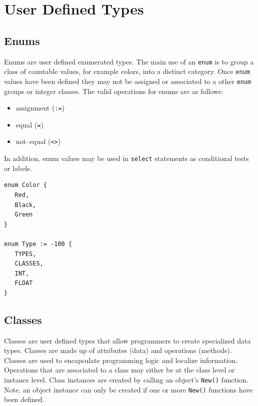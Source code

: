 \documentclass[11pt]{article}
\begin{document}
\section{User Defined Types}

\subsection{Enums}
Enums are user defined enumerated types.  The main use of an
\texttt{enum} is to group a class of countable values, for example
colors, into a distinct category.  Once \texttt{enum} values have been
defined they may not be assigned or associated to a other
\texttt{enum} groups or integer classes.  The valid operations for
enums are as follows:

\begin{itemize}
\item assignment (\texttt{:=})
\item equal (\texttt{=})
\item not--equal (\texttt{<>})
\end{itemize}

In addition, enum values may be used in \texttt{select} statements as
conditional tests or labels.

\begin{verbatim}
enum Color {
   Red,
   Black,
   Green
}

enum Type := -100 {
   TYPES,
   CLASSES,
   INT,
   FLOAT
}
\end{verbatim}

\subsection{Classes}
Classes are user defined types that allow programmers to create
specialized data types.  Classes are made up of attributes (data) and
operations (methods).  Classes are used to encapsulate programming
logic and localize information.  Operations that are associated to a
class may either be at the class level or instance level.  Class
instances are created by calling an object's \texttt{New()} function.
Note, an object instance can only be created if one or more
\texttt{New()} functions have been defined.
\end{document}
